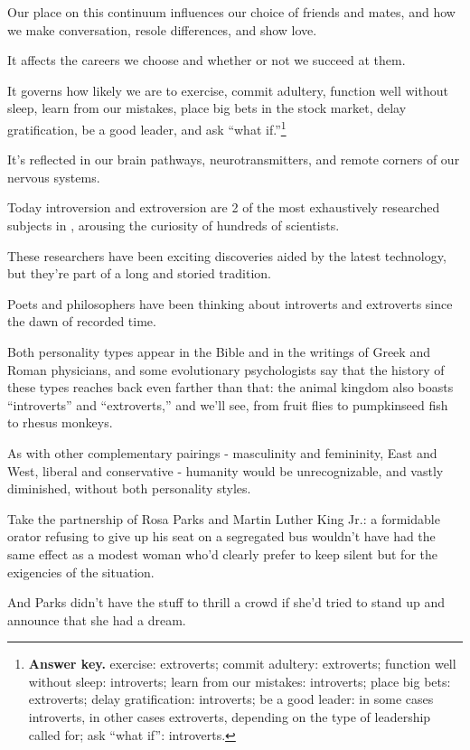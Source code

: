\documentclass[oneside]{article}
\numberwithin{equation}{section}
\begin{document}
Our place on this continuum influences our choice of friends and mates, and how we make conversation, resole differences, and show love.

It affects the careers we choose and whether or not we succeed at them.

It governs how likely we are to exercise, commit adultery, function well without sleep, learn from our mistakes, place big bets in the stock market, delay gratification, be a good leader, and ask ``what if.''\footnote{\textbf{Answer key.} exercise: extroverts; commit adultery: extroverts; function well without sleep: introverts; learn from our mistakes: introverts; place big bets: extroverts; delay gratification: introverts; be a good leader: in some cases introverts, in other cases extroverts, depending on the type of leadership called for; ask ``what if'': introverts.}

It's reflected in our brain pathways, neurotransmitters, and remote corners of our nervous systems.

Today introversion and extroversion are 2 of the most exhaustively researched subjects in , arousing the curiosity of hundreds of scientists.

%
These researchers have been exciting discoveries aided by the latest technology, but they're part of a long and storied tradition.

Poets and philosophers have been thinking about introverts and extroverts since the dawn of recorded time.

Both personality types appear in the Bible and in the writings of Greek and Roman physicians, and some evolutionary psychologists say that the history of these types reaches back even farther than that: the animal kingdom also boasts ``introverts'' and ``extroverts,'' and we'll see, from fruit flies to pumpkinseed fish to rhesus monkeys.

As with other complementary pairings - masculinity and femininity, East and West, liberal and conservative - humanity would be unrecognizable, and vastly diminished, without both personality styles.

%
Take the partnership of Rosa Parks and Martin Luther King Jr.: a formidable orator refusing to give up his seat on a segregated bus wouldn't have had the same effect as a modest woman who'd clearly prefer to keep silent but for the exigencies of the situation.

And Parks didn't have the stuff to thrill a crowd if she'd tried to stand up and announce that she had a dream.
\end{document}
